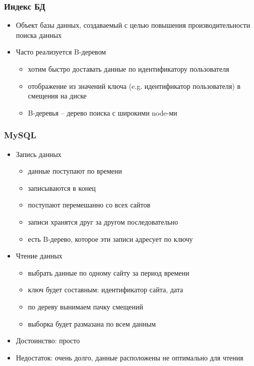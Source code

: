 \documentclass[xetex,mathserif,serif]{beamer}
\begin{document}
\begin{frame}
	\frametitle{Индекс БД}

	\begin{itemize}
		\item Объект базы данных, создаваемый с целью повышения производительности поиска данных
		\item Часто реализуется B-деревом
		      \begin{itemize}
			      \item хотим быстро доставать данные по идентификатору пользователя
			      \item отображение из значений ключа (e.g. идентификатор пользователя) в смещения на диске
			      \item B-деревья -- дерево поиска с широкими node-ми
		      \end{itemize}
	\end{itemize}
\end{frame}


\begin{frame}
	\frametitle{MySQL}

	\begin{itemize}
		\item Запись данных
		      \begin{itemize}
			      \item данные поступают по времени
			      \item записываются в конец
			      \item поступают перемешанно со всех сайтов
			      \item записи хранятся друг за другом последовательно
			      \item есть B-дерево, которое эти записи адресует по ключу
		      \end{itemize}
		\item Чтение данных
		      \begin{itemize}
			      \item выбрать данные по одному сайту за период времени
			      \item ключ будет составным: идентификатор сайта, дата
			      \item по дереву вынимаем пачку смещений
			      \item выборка будет размазана по всем данным
		      \end{itemize}
		\item Достоинство: просто
		\item Недостаток: очень долго, данные расположены не оптимально для чтения
	\end{itemize}
\end{frame}
\end{document}
